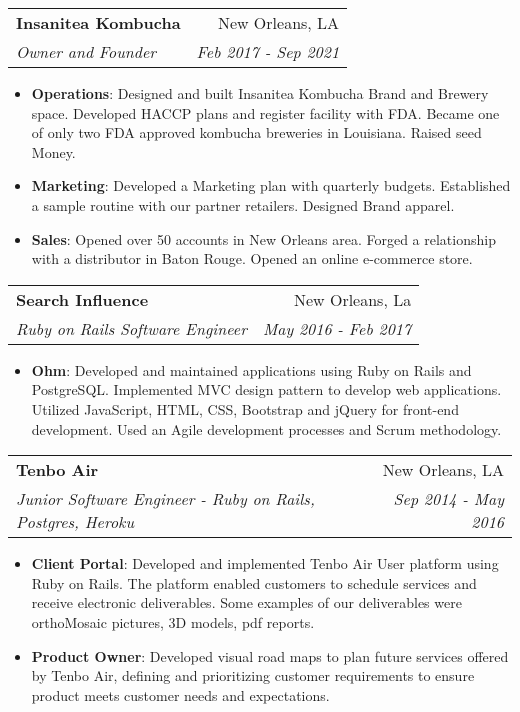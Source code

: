 \documentclass[letterpaper,11pt]{article}
\makeatletter
\newcommand{\resumeItem}[2]{
  \item\small{
    \textbf{#1}{: #2 \vspace{-2pt}}
  }
}
\newcommand{\resumeSubheading}[4]{
  \vspace{-1pt}\item
    \begin{tabular*}{0.97\textwidth}[t]{l@{\extracolsep{\fill}}r}
      \textbf{#1} & #2 \\
      \textit{\small#3} & \textit{\small #4} \\
    \end{tabular*}\vspace{-5pt}
}
\newcommand{\resumeSubSubheading}[2]{
    \begin{tabular*}{0.97\textwidth}{l@{\extracolsep{\fill}}r}
      \textit{\small#1} & \textit{\small #2} \\
    \end{tabular*}\vspace{-5pt}
}
\newcommand{\resumeSubHeadingListEnd}{\end{itemize}}
\newcommand{\resumeItemListStart}{\begin{itemize}}
\newcommand{\resumeItemListEnd}{\end{itemize}\vspace{-5pt}}
\makeatother
\begin{document}

    \resumeSubheading
      {Insanitea Kombucha}{New Orleans, LA}
      {Owner and Founder}{Feb 2017 - Sep 2021}
      \resumeItemListStart
        \resumeItem{Operations}
          {Designed and built Insanitea Kombucha Brand and Brewery space. Developed HACCP plans and register facility with FDA. Became one of only two FDA approved kombucha breweries in Louisiana. Raised seed Money.}
        \resumeItem{Marketing}
          {Developed a Marketing plan with quarterly budgets. Established a sample routine with our partner retailers. Designed Brand apparel.}
        \resumeItem{Sales}
          {Opened over 50 accounts in New Orleans area. Forged a relationship with a distributor in Baton Rouge. Opened an online e-commerce store.}        
      \resumeItemListEnd

    \resumeSubheading
      {Search Influence}{New Orleans, La}
      {Ruby on Rails Software Engineer}{May 2016 - Feb 2017}
      \resumeItemListStart
        \resumeItem{Ohm}
          {Developed and maintained applications using Ruby on Rails and PostgreSQL. Implemented MVC design pattern to develop web applications. Utilized JavaScript, HTML, CSS, Bootstrap and jQuery for front-end development. Used an Agile development processes and Scrum methodology.}
                 
      \resumeItemListEnd

    \resumeSubheading
      {Tenbo Air}{New Orleans, LA}
      { Junior Software Engineer - Ruby on Rails, Postgres, Heroku }{Sep 2014 - May 2016}
      \resumeItemListStart
        \resumeItem{Client Portal}
          {Developed and implemented Tenbo Air User platform using Ruby on Rails. The platform enabled customers to schedule services and receive electronic deliverables. Some examples of our deliverables were orthoMosaic pictures, 3D models, pdf reports. }
        \resumeItem{ Product Owner}
          {Developed visual road maps to plan future services offered by Tenbo Air, defining and prioritizing customer requirements to ensure product meets customer needs and expectations.}
      \resumeItemListEnd
\end{document}
